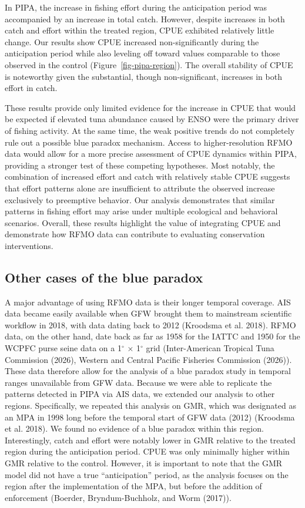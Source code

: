 \documentclass[
  letterpaper,
  DIV=11,
  numbers=noendperiod]{scrartcl}
\begin{document}
In PIPA, the increase in fishing effort during the anticipation period
was accompanied by an increase in total catch. However, despite
increases in both catch and effort within the treated region, CPUE
exhibited relatively little change. Our results show CPUE increased
non-significantly during the anticipation period while also leveling off
toward values comparable to those observed in the control
(Figure~\ref{fig-pipa-region}). The overall stability of CPUE is
noteworthy given the substantial, though non-significant, increases in
both effort in catch.

These results provide only limited evidence for the increase in CPUE
that would be expected if elevated tuna abundance caused by ENSO were
the primary driver of fishing activity. At the same time, the weak
positive trends do not completely rule out a possible blue paradox
mechanism. Access to higher-resolution RFMO data would allow for a more
precise assessment of CPUE dynamics within PIPA, providing a stronger
test of these competing hypotheses. Most notably, the combination of
increased effort and catch with relatively stable CPUE suggests that
effort patterns alone are insufficient to attribute the observed
increase exclusively to preemptive behavior. Our analysis demonstrates
that similar patterns in fishing effort may arise under multiple
ecological and behavioral scenarios. Overall, these results highlight
the value of integrating CPUE and demonstrate how RFMO data can
contribute to evaluating conservation interventions.

\subsection{Other cases of the blue
paradox}\label{other-cases-of-the-blue-paradox}

A major advantage of using RFMO data is their longer temporal coverage.
AIS data became easily available when GFW brought them to mainstream
scientific workflow in 2018, with data dating back to 2012 (Kroodsma et
al. 2018). RFMO data, on the other hand, date back as far as 1958 for
the IATTC and 1950 for the WCPFC purse seine data on a 1\(^\circ\) ×
1\(^\circ\) grid (Inter-American Tropical Tuna Commission (2026),
Western and Central Pacific Fisheries Commission (2026)). These data
therefore allow for the analysis of a blue paradox study in temporal
ranges unavailable from GFW data. Because we were able to replicate the
patterns detected in PIPA via AIS data, we extended our analysis to
other regions. Specifically, we repeated this analysis on GMR, which was
designated as an MPA in 1998 long before the temporal start of GFW data
(2012) (Kroodsma et al. 2018). We found no evidence of a blue paradox
within this region. Interestingly, catch and effort were notably lower
in GMR relative to the treated region during the anticipation period.
CPUE was only minimally higher within GMR relative to the control.
However, it is important to note that the GMR model did not have a true
``anticipation'' period, as the analysis focuses on the region after the
implementation of the MPA, but before the addition of enforcement
(Boerder, Bryndum-Buchholz, and Worm (2017)).
\end{document}

